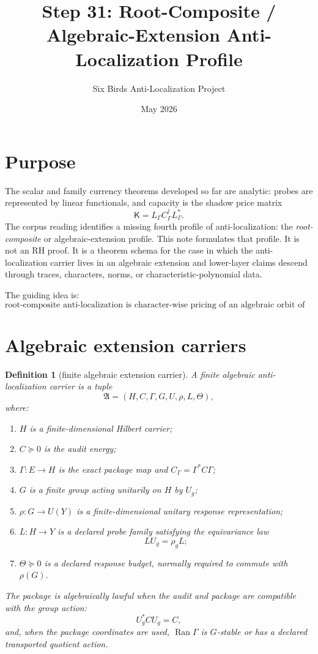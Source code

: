 \documentclass[11pt]{article}
\title{Step 31: Root-Composite / Algebraic-Extension Anti-Localization Profile}
\author{Six Birds Anti-Localization Project}
\date{May 2026}
\newtheorem{definition}[theorem]{Definition}
\newcommand{\Ran}{\operatorname{Ran}}
\newcommand{\K}{\mathsf K}
\begin{document}
\maketitle

\section{Purpose}
The scalar and family currency theorems developed so far are analytic: probes are represented by linear functionals, and capacity is the shadow price matrix
\[
  \K=L_\Gamma C_\Gamma^\dagger L_\Gamma^* .
\]
The corpus reading identifies a missing fourth profile of anti-localization: the \emph{root-composite} or algebraic-extension profile.  This note formulates that profile.  It is not an RH proof.  It is a theorem schema for the case in which the anti-localization carrier lives in an algebraic extension and lower-layer claims descend through traces, characters, norms, or characteristic-polynomial data.

The guiding idea is:
\[
\boxed{\text{root-composite anti-localization is character-wise pricing of an algebraic orbit of probes.}}
\]

\section{Algebraic extension carriers}

\begin{definition}[finite algebraic extension carrier]
A finite algebraic anti-localization carrier is a tuple
\[
  \mathfrak A=(H,C,\Gamma,G,U,\rho,L,\Theta),
\]
where:
\begin{enumerate}[label=(\roman*)]
  \item $H$ is a finite-dimensional Hilbert carrier;
  \item $C\succeq0$ is the audit energy;
  \item $\Gamma:E\to H$ is the exact package map and $C_\Gamma=\Gamma^*C\Gamma$;
  \item $G$ is a finite group acting unitarily on $H$ by $U_g$;
  \item $\rho:G\to U(Y)$ is a finite-dimensional unitary response representation;
  \item $L:H\to Y$ is a declared probe family satisfying the equivariance law
  \[
    L U_g=\rho_g L;
  \]
  \item $\Theta\succeq0$ is a declared response budget, normally required to commute with $\rho(G)$.
\end{enumerate}
The package is algebraically lawful when the audit and package are compatible with the group action:
\[
  U_g^*CU_g=C,
\]
and, when the package coordinates are used, $\Ran\Gamma$ is $G$-stable or has a declared transported quotient action.
\end{definition}
\end{document}
